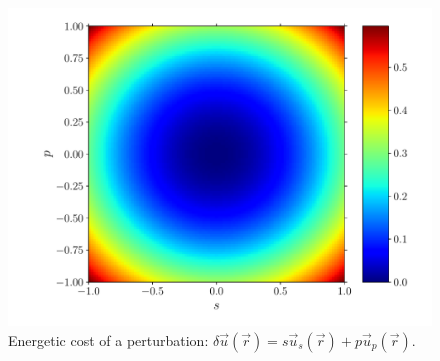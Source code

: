 \documentclass[fleqn]{goose-article}
\begin{document}
\begin{figure}[htp]
    \centering
    \includegraphics[width=.5\textwidth]{phase-diagram_energy.pdf}
    \caption{
        Energetic cost of a perturbation:
        $\delta \vec{u}(\vec{r}) = s \vec{u}_s (\vec{r}) + p \vec{u}_p (\vec{r})$.
    }
    \label{fig:energy}
\end{figure}
\end{document}
